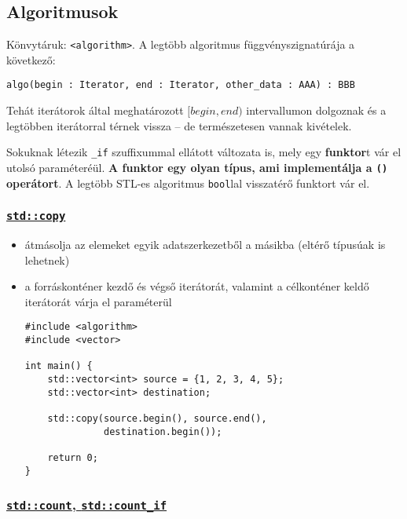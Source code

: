 \documentclass[a4paper, 11pt, oneside]{book}
\begin{document}
\subsection{Algoritmusok}

Könvytáruk: \verb*|<algorithm>|. A legtöbb algoritmus függvényszignatúrája a következő:

\begin{center}
	\verb|algo(begin : Iterator, end : Iterator, other_data : AAA) : BBB|
\end{center}

Tehát iterátorok által meghatározott $[begin, end)$ intervallumon dolgoznak és a legtöbben iterátorral térnek vissza -- de természetesen vannak kivételek.

Sokuknak létezik \verb*|_if| szuffixummal ellátott változata is, mely egy \textbf{funktor}t vár el utolsó paraméteréül. \textbf{A funktor egy olyan típus, ami implementálja a \texttt{()} operátort}. A legtöbb STL-es algoritmus \verb*|bool|lal visszatérő funktort vár el.

\clearpage

\subsubsection{\underline{\texttt{std::copy}}}

\begin{itemize}
	\item átmásolja az elemeket egyik adatszerkezetből a másikba (eltérő típusúak is lehetnek)
	\item a forráskonténer kezdő és végső iterátorát, valamint a célkonténer keldő iterátorát várja el paraméterül
	
	\begin{lstlisting}[style=cppstyle]
#include <algorithm>
#include <vector>

int main() {
	std::vector<int> source = {1, 2, 3, 4, 5};	
	std::vector<int> destination;

	std::copy(source.begin(), source.end(), 
			  destination.begin());
	
	return 0;
}
	\end{lstlisting}
\end{itemize}

\subsubsection{\underline{\texttt{std::count}, \texttt{std::count\_if}}}
\end{document}
